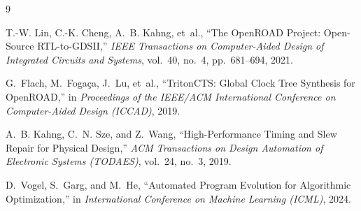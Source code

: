 \documentclass[10pt,twocolumn]{article}
\begin{document}
\begin{thebibliography}{9}

T.-W. Lin, C.-K. Cheng, A.~B. Kahng, et~al.,
``The OpenROAD Project: Open-Source RTL-to-GDSII,''
\textit{IEEE Transactions on Computer-Aided Design of Integrated Circuits and Systems}, vol.~40, no.~4, pp.~681--694, 2021.

G.~Flach, M.~Foga\c{c}a, J.~Lu, et~al.,
``TritonCTS: Global Clock Tree Synthesis for OpenROAD,''
in \textit{Proceedings of the IEEE/ACM International Conference on Computer-Aided Design (ICCAD)}, 2019.

A.~B. Kahng, C.~N. Sze, and Z.~Wang,
``High-Performance Timing and Slew Repair for Physical Design,''
\textit{ACM Transactions on Design Automation of Electronic Systems (TODAES)}, vol.~24, no.~3, 2019.

D.~Vogel, S.~Garg, and M.~He,
``Automated Program Evolution for Algorithmic Optimization,''
in \textit{International Conference on Machine Learning (ICML)}, 2024.

\end{thebibliography}
\end{document}
